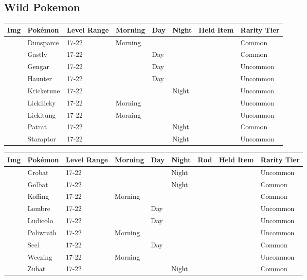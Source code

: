 \subsection{Wild Pokemon}%
\label{subsec:WildPokemon}%
\begin{longtable}{||l l l l l l l l||}%
\hline%
Img&Pokémon&Level Range&Morning&Day&Night&Held Item&Rarity Tier\\%
\hline%
\endhead%
\hline%
&Dunsparce&17{-}22&Morning&&&&Common\\%
\hline%
&Gastly&17{-}22&&Day&&&Common\\%
\hline%
&Gengar&17{-}22&&Day&&&Uncommon\\%
\hline%
&Haunter&17{-}22&&Day&&&Uncommon\\%
\hline%
&Kricketune&17{-}22&&&Night&&Uncommon\\%
\hline%
&Lickilicky&17{-}22&Morning&&&&Uncommon\\%
\hline%
&Lickitung&17{-}22&Morning&&&&Uncommon\\%
\hline%
&Patrat&17{-}22&&&Night&&Common\\%
\hline%
&Staraptor&17{-}22&&&Night&&Uncommon\\%
\hline%
\end{longtable}%
\begin{longtable}{||l l l l l l l l l||}%
\hline%
Img&Pokémon&Level Range&Morning&Day&Night&Rod&Held Item&Rarity Tier\\%
\hline%
\endhead%
\hline%
&Crobat&17{-}22&&&Night&&&Uncommon\\%
\hline%
&Golbat&17{-}22&&&Night&&&Common\\%
\hline%
&Koffing&17{-}22&Morning&&&&&Common\\%
\hline%
&Lombre&17{-}22&&Day&&&&Uncommon\\%
\hline%
&Ludicolo&17{-}22&&Day&&&&Uncommon\\%
\hline%
&Poliwrath&17{-}22&Morning&&&&&Uncommon\\%
\hline%
&Seel&17{-}22&&Day&&&&Common\\%
\hline%
&Weezing&17{-}22&Morning&&&&&Uncommon\\%
\hline%
&Zubat&17{-}22&&&Night&&&Common\\%
\hline%
\end{longtable}